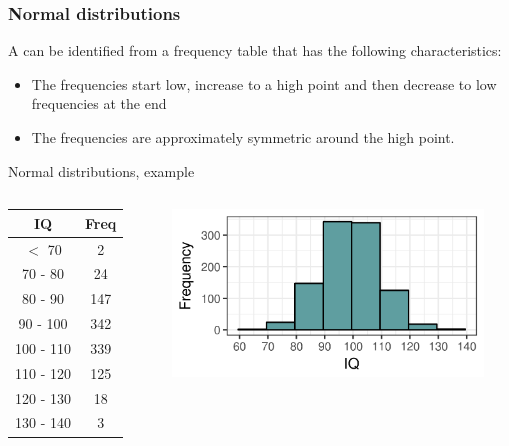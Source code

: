 \documentclass[xcolor=table, aspectratio=169, bigger, handout]{beamer}
\begin{document}
\begin{frame}
\frametitle{Normal distributions}

\begin{block}{}
A  can be identified from a frequency table that has the following characteristics:
\begin{itemize}
\item The frequencies start low, increase to a high point and then decrease to low frequencies at the end
\item The frequencies are approximately symmetric around the high point.
\end{itemize}
\end{block}
\end{frame}

\begin{frame}{Normal distributions, example}

\begin{columns}
\begin{column}{0.35\textwidth}
\begin{exampleblock}{}
\begin{center}
\begin{tabular}{cc}
IQ & Freq \\
\hline
$<$ 70 & 2 \\
70 - 80 & 24 \\
80 - 90 & 147 \\
90 - 100 & 342 \\
100 - 110 & 339 \\
110 - 120 & 125 \\
120 - 130 & 18 \\
130 - 140 & 3 \\
\end{tabular}
\end{center}
\end{exampleblock}
\end{column}
\pause
\begin{column}{0.65\textwidth}
\begin{center}
\includegraphics[width=3.25in]{../images/wk04_iq_hist}

\end{center}
\end{column}
\end{columns}

\end{frame}
\end{document}
